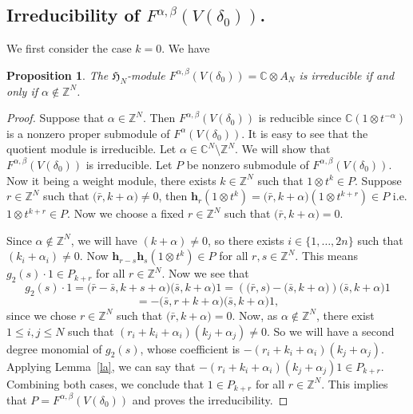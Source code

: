 \documentclass[a4paper,11pt]{amsart}
\numberwithin{equation}{section}
\theoremstyle{plain}
\newtheorem{proposition}[theorem]{Proposition}
\newcommand{\Z}{\mathbb{Z}}
\newcommand{\C}{\mathbb{C}}
\newcommand{\Ha}{\mathfrak{H}_{N}}
\renewcommand{\H}{\mathbf{h}}
\begin{document}
\subsection{Irreducibility of $F^{\alpha,\beta}(V(\delta_0))$.}
We first consider the case $k=0$. We have

\begin{proposition}\label{prop1}
   The $\Ha$-module $F^{\alpha,\beta}(V(\delta_0))=\C\otimes A_N$ is irreducible if and only if  $\alpha\notin \Z^N$.
   
   
    
    
\end{proposition}
\begin{proof}
Suppose that $\alpha\in \Z^N$. Then $F^{\alpha,\beta}(V(\delta_0))$ is reducible  since $\C(1\otimes t^{-\alpha})$ is a nonzero proper submodule of $F^\alpha(V(\delta_0))$. It is easy to see that the quotient module is irreducible.
 Let $\alpha\in \C^N\setminus \Z^N$. We will show that $F^{\alpha,\beta}(V(\delta_0))$ is irreducible. 
    Let $P$ be nonzero submodule of $F^{\alpha,\beta}(V(\delta_0))$. 
    Now it being a weight module, there exists $k\in \Z^N$ such that $1\otimes t^k\in P$. Suppose $r\in \Z^N$ such that $\bm{(}\bar{r}, k+\alpha\bm{)}\neq 0$, then $\H_r(1\otimes t^k)=\bm{(}\bar{r}, k+\alpha\bm{)}(1\otimes t^{k+r})\in P$ i.e. $1\otimes t^{k+r}\in P$. Now we choose a fixed $r\in \Z^N$ such that $\bm{(}\bar{r}, k+\alpha\bm{)}=0$. 
    
    Since $\alpha\notin \Z^N $, we will have $(k+\alpha)\neq 0$, so there exists $i\in \{1,\dots, 2n \}$ such that $(k_i+\alpha_i)\neq 0$. Now $\H_{r-s}\H_s(1\otimes t^k)\in P$ for all $r,s\in \Z^N$. This means $g_2(s)\cdot 1\in P_{k+r}$ for all $r\in \Z^N$. Now we see that
     \[ 
      g_2(s)\cdot 1=\bm{(}\bar{r}-\bar{s},k+s+\alpha\bm{)}\bm{(}\bar{s},k+\alpha\bm{)}1=(\bm{(}\bar{r},s\bm{)}-\bm{(}\bar{s},k+\alpha\bm{)})\bm{(}\bar{s},k+\alpha\bm{)}1\]
      \[=-\bm{(}\bar{s},r+k+\alpha\bm{)}\bm{(}\bar{s},k+\alpha\bm{)}1,\]
since we chose $r\in \Z^N$ such that $\bm{(}\bar{r},k+\alpha\bm{)}=0$. Now, as $\alpha\notin \Z^N$, there exist $1\leq i,j\leq N$ such that $(r_i+k_i+\alpha_i)(k_j+\alpha_j)\neq 0$. So we will have a second degree monomial of $g_2(s)$, whose coefficient is $-(r_i+k_i+\alpha_i)(k_j+\alpha_j)$. Applying Lemma~\ref{la}, we can say that $-(r_i+k_i+\alpha_i)(k_j+\alpha_j) 1\in P_{k+r}$. Combining both  cases, we conclude that $1\in P_{k+r}$ for all $r\in \Z^N$. This implies that $P=F^{\alpha,\beta}(V(\delta_0))$ and proves the irreducibility.
\end{proof}
 
\end{document}
